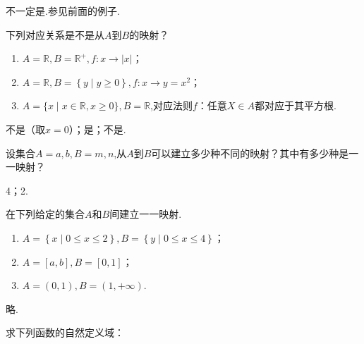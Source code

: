 \documentclass[lang=cn,newtx,10pt,scheme=chinese]{elegantbook}
\begin{document}
\begin{solution}
  不一定是.参见前面的例子.
\end{solution}

\begin{exercise}\label{HS2FZ_lkb1_P34_exp.4,BJSZ_Algebra1_P40}
  下列对应关系是不是从$A$到$B$的映射？
\end{exercise}

\begin{enumerate}
  \item $A=\mathbb{R},B=\mathbb{R}^{+},f:x\rightarrow\left|x\right|$；
  \item $A=\mathbb{R},B=\left\{y\mid y\geqslant 0\right\},f:x\rightarrow y=x^2$；
  \item $A=\{x\mid x\in\mathbb{R},x\geqslant0\},B=\mathbb{R}$,对应法则$f$：任意$X\in A$都对应于其平方根.
\end{enumerate}

\begin{solution}
  不是（取$x=0$）；是；不是.
\end{solution}

\begin{exercise}
  设集合$A={a,b},B={m,n}$,从$A$到$B$可以建立多少种不同的映射？其中有多少种是一一映射？
\end{exercise}

\begin{solution}
  4；2.
\end{solution}

\begin{exercise}
  在下列给定的集合$A$和$B$间建立一一映射.
\end{exercise}

\begin{enumerate}
  \item $A=\left\{x\mid 0\leqslant x\leqslant 2\right\},B=\left\{y\mid 0\leqslant x\leqslant 4\right\}$；
  \item $A=[a,b],B=[0,1]$；
  \item $A=(0,1),B=(1,+\infty)$.
\end{enumerate}

\begin{solution}
  略.
\end{solution}

\begin{exercise}
  求下列函数的自然定义域：
\end{exercise}
\end{document}
